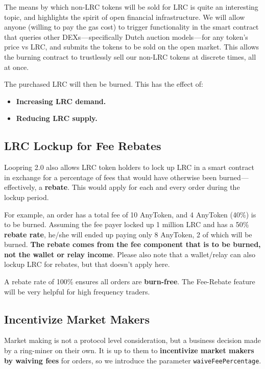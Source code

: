 \documentclass[UTF8,nofonts]{article}
\begin{document}
\begin{multicols}{2}
\begin{appendices}
The means by which non-LRC tokens will be sold for LRC is quite an interesting topic, and highlights the spirit of open financial infrastructure. We will allow anyone (willing to pay the gas cost) to trigger functionality in the smart contract that queries other DEXs — specifically Dutch auction models — for any token’s price vs LRC, and submits the tokens to be sold on the open market. This allows the burning contract to trustlessly sell our non-LRC tokens at discrete times, all at once.

The purchased LRC will then be burned. This has the effect of:

\begin{itemize}
	\item \textbf{Increasing LRC demand.}
	\item \textbf{Reducing LRC supply.}
\end{itemize}

\subsection{LRC Lockup for Fee Rebates}
Loopring 2.0 also allows LRC token holders to lock up LRC in a smart contract in exchange for a percentage of fees that would have otherwise been burned — effectively, a \textbf{rebate}. This would apply for each and every order during the lockup period.

For example, an order has a total fee of 10 AnyToken, and 4 AnyToken (40\%) is to be burned. Assuming the fee payer locked up 1 million LRC and has a 50\% \textbf{rebate rate}, he/she will ended up paying only 8 AnyToken, 2 of which will be burned. \textbf{The rebate comes from the fee component that is to be burned, not the wallet or relay income}. Please also note that a wallet/relay can also lockup LRC for rebates, but that doesn’t apply here.

A rebate rate of 100\% ensures all orders are \textbf{burn-free}. The Fee-Rebate feature will be very helpful for high frequency traders.


\subsection{Incentivize Market Makers}
Market making is not a protocol level consideration, but a business decision made by a ring-miner on their own. It is up to them to \textbf{incentivize market makers by waiving fees} for orders, so we introduce the parameter \verb|waiveFeePercentage|.


\end{appendices}
\end{multicols}
\end{document}
